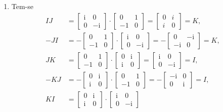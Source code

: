 \documentclass[12pt,a4paper]{article}
\newcommand\ii{\mathrm{i}}
\begin{document}
\begin{enumerate}
\begin{enumerate}
\item Tem-se
\begin{align*}
IJ
& =   \begin{bmatrix} \ii & 0 \\ 0 & -\ii \end{bmatrix}
\cdot \begin{bmatrix} 0 & 1 \\ -1 & 0 \end{bmatrix}
= \begin{bmatrix} 0 & i \\ i & 0 \end{bmatrix}
= K, \\
-JI
& =  -\begin{bmatrix} 0 & 1 \\ -1 & 0 \end{bmatrix}
\cdot \begin{bmatrix} \ii & 0 \\ 0 & -\ii \end{bmatrix}
= - \begin{bmatrix} 0 & -\ii \\ -\ii & 0 \end{bmatrix}
= K, \\
JK
& =   \begin{bmatrix} 0 & 1 \\ -1 & 0 \end{bmatrix}
\cdot \begin{bmatrix} 0 & \ii \\ \ii & 0 \end{bmatrix}
= \begin{bmatrix} \ii & 0 \\ 0 & -\ii \end{bmatrix}
= I, \\
-KJ
& =  -\begin{bmatrix} 0 & \ii \\ \ii & 0 \end{bmatrix}
\cdot \begin{bmatrix} 0 & 1 \\ -1 & 0 \end{bmatrix}
=    -\begin{bmatrix} -\ii & 0 \\ 0 & \ii \end{bmatrix}
= I, \\
KI
& =   \begin{bmatrix} 0 & \ii \\ \ii & 0 \end{bmatrix}
\cdot \begin{bmatrix} \ii & 0 \\ 0 & -\ii \end{bmatrix}

\end{align*}
\end{enumerate}
\end{enumerate}
\end{document}
